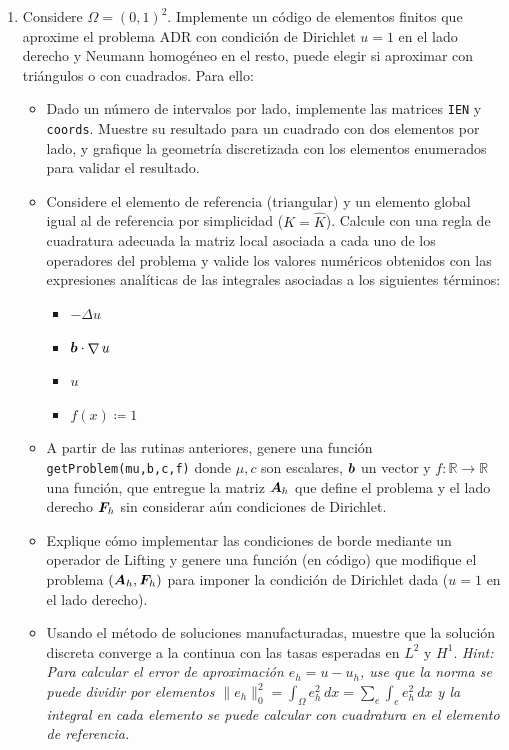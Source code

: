 \documentclass{article}
\renewcommand{\vec}{\vectorsym}
\newcommand{\mat}{\matrixsym}
\DeclareMathOperator{\grad}{\nabla}
\newcommand{\R}{\mathbb{R}}
\begin{document}
\begin{enumerate}
    \item Considere $\Omega = (0,1)^2$. Implemente un código de elementos finitos que aproxime el problema ADR con condición de Dirichlet $u=1$ en el lado derecho y Neumann homogéneo en el resto, puede elegir si aproximar con triángulos o con cuadrados. Para ello: 
            \begin{itemize}
                \item{} Dado un número de intervalos por lado, implemente las matrices \texttt{IEN} y \texttt{coords}. Muestre su resultado para un cuadrado con dos elementos por lado, y grafique la geometría discretizada con los elementos enumerados para validar el resultado.
                \item Considere el elemento de referencia (triangular) y un elemento global igual al de referencia por simplicidad ($K = \hat K$). Calcule con una regla de cuadratura adecuada la matriz local asociada a cada uno de los operadores del problema y valide los valores numéricos obtenidos con las expresiones analíticas de las integrales asociadas a los siguientes términos: 
                    \begin{itemize}
                        \item{} $-\Delta u$
                        \item{} $\vec b \cdot \grad u$
                        \item{} $u$
                        \item{} $f(x)\coloneqq 1$
                    \end{itemize}

                \item{} A partir de las rutinas anteriores, genere una función \texttt{getProblem(mu,b,c,f)} donde $\mu,c$ son escalares, $\vec b$ un vector y $f:\R\to\R$ una función, que entregue la matriz $\mat A_h$ que define el problema y el lado derecho $\vec F_h$ sin considerar aún condiciones de Dirichlet.
                \item{} Explique cómo implementar las condiciones de borde mediante un operador de Lifting y genere una función (en código) que modifique el problema $(\mat A_h, \vec F_h)$ para imponer la condición de Dirichlet dada ($u=1$ en el lado derecho).
                \item{} Usando el método de soluciones manufacturadas, muestre que la solución discreta converge a la continua con las tasas esperadas en $L^2$ y $H^1$. \emph{Hint: Para calcular el error de aproximación $e_h = u - u_h$, use que la norma se puede dividir por elementos $\|e_h\|_0^2 = \int_\Omega e_h^2\,dx = \sum_e \int_e e_h^2\,dx$ y la integral en cada elemento se puede calcular con cuadratura en el elemento de referencia.}
            \end{itemize}


\end{enumerate}
\end{document}
